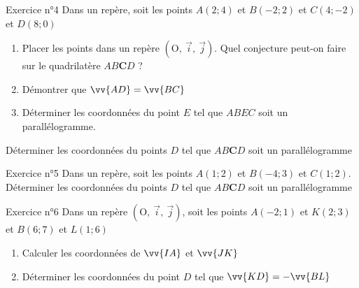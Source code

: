 \documentclass[12pt,a4paper]{article}
\def\Oij{$\left(\text{O},~\vec{i},~\vec{j}\right)$}
\begin{document}
\begin{framed}
\vspace{3cm}
\end{framed}


\begin{mybox}{Exercice n°4}
Dans un repère, soit les points $A(2; 4)$ et $B(-2; 2)$ et $C(4; -2)$ et $D(8;0)$\\

\begin{enumerate}
    \item Placer les points dans un repère \Oij{}. Quel conjecture peut-on faire sur le quadrilatère $AB\textbf{C}D$ ?
    \item Démontrer que $\vv{AD}=\vv{BC}$
    \item Déterminer les coordonnées du point $E$ tel que $ABEC$ soit un parallélogramme.
\end{enumerate}

Déterminer les coordonnées du points $D$ tel que $AB\textbf{C}D$ soit un parallélogramme
\end{mybox}

\begin{framed}
\vspace{3cm}
\end{framed}





\begin{mybox}{Exercice n°5}
Dans un repère, soit les points $A(1; 2)$ et $B(-4; 3)$ et $C(1; 2)$.\\
Déterminer les coordonnées du points $D$ tel que $AB\textbf{C}D$ soit un parallélogramme
\end{mybox}

\begin{framed}
\vspace{3cm}
\end{framed}


\begin{mybox}{Exercice n°6}
Dans un repère \Oij{}, soit les points $A(-2; 1)$ et $K(2; 3)$ et $B(6; 7)$ et $L(1;6)$\\
\begin{enumerate}
    \item Calculer les coordonnées de $\vv{IA}$ et $\vv{JK}$
    \item Déterminer les coordonnées du point $D$ tel que $\vv{KD}=-\vv{BL}$
\end{enumerate}
\end{mybox}
\end{document}
